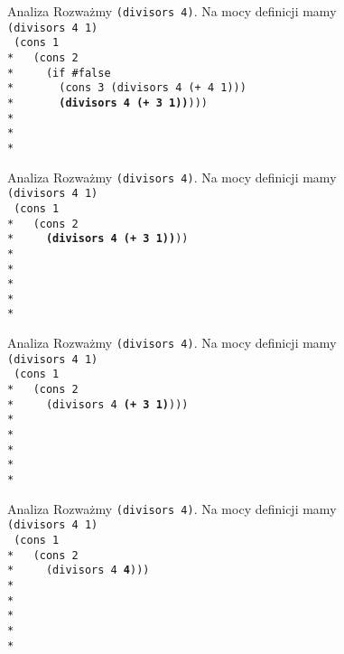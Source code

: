\begin{frame}{Analiza}
  Rozważmy \texttt{(divisors 4)}. Na mocy definicji mamy\\
  \texttt{(divisors 4 1)}\\
  \texttt{
(cons 1 \\*
\ \ (cons 2 \\*
\ \ \ \ (if \#false\\*
\ \ \ \ \ \ (cons 3 (divisors 4 (+ 4 1)))\\*
\ \ \ \ \ \ \textbf{(divisors 4 (+ 3 1))})))\\*
\ \\*
\ \\*
  }
\end{frame}

\begin{frame}{Analiza}
  Rozważmy \texttt{(divisors 4)}. Na mocy definicji mamy\\
  \texttt{(divisors 4 1)}\\
  \texttt{
(cons 1 \\*
\ \ (cons 2 \\*
\ \ \ \ \textbf{(divisors 4 (+ 3 1))}))\\*
\ \\*
\ \\*
\ \\*
\ \\*
  }
\end{frame}

\begin{frame}{Analiza}
  Rozważmy \texttt{(divisors 4)}. Na mocy definicji mamy\\
  \texttt{(divisors 4 1)}\\
  \texttt{
(cons 1 \\*
\ \ (cons 2 \\*
\ \ \ \ (divisors 4 \textbf{(+ 3 1)})))\\*
\ \\*
\ \\*
\ \\*
\ \\*
  }
\end{frame}

\begin{frame}{Analiza}
  Rozważmy \texttt{(divisors 4)}. Na mocy definicji mamy\\
  \texttt{(divisors 4 1)}\\
  \texttt{
(cons 1 \\*
\ \ (cons 2 \\*
\ \ \ \ (divisors 4 \textbf{4})))\\*
\ \\*
\ \\*
\ \\*
\ \\*
  }
\end{frame}

